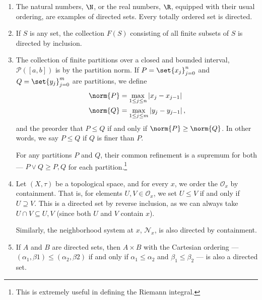 \begin{example}
  \begin{enumerate}[(1)]
    \item The natural numbers, $\N$, or the real numbers, $\R$, equipped with their usual ordering, are examples of directed sets. Every totally ordered set is directed.
    \item If $S$ is any set, the collection $F(S)$ consisting of all finite subsets of $S$ is directed by inclusion.
    \item The collection of finite partitions over a closed and bounded interval, $\mathcal{P}\left(\left[a,b\right]\right)$ is by the partition norm. If $P = \set{x_j}_{j=0}^{n}$ and $Q=\set{y_j}_{j=0}^{m}$ are partitions, we define
      \begin{align*}
        \norm{P} &= \max_{1\leq j\leq n}\left\vert x_j-x_{j-1} \right\vert\\
        \norm{Q} &= \max_{1\leq j \leq m}\left\vert y_{j} - y_{j-1} \right\vert,
      \end{align*}
      and the preorder that $P \leq Q$ if and only if $\norm{P} \geq \norm{Q}$. In other words, we say $P\leq Q$ if $Q$ is finer than $P$.\newline

      For any partitions $P$ and $Q$, their common refinement is a supremum for both --- $P\vee Q \geq P,Q$ for each partition.\footnote{This is extremely useful in defining the Riemann integral.}
    \item Let $\left(X,\tau\right)$ be a topological space, and for every $x$, we order the $\mathcal{O}_{x}$ by containment. That is, for elements $U,V\in \mathcal{O}_{x}$, we set $U\leq V$ if and only if $U\supseteq V$. This is a directed set by reverse inclusion, as we can always take $U\cap V \subseteq U,V$ (since both $U$ and $V$ contain $x$).\newline

      Similarly, the neighborhood system at $x$, $\mathcal{N}_x$, is also directed by containment.
    \item If $A$ and $B$ are directed sets, then $A\times B$ with the Cartesian ordering --- $\left(\alpha_1,\beta 1\right) \leq \left(\alpha_2,\beta 2\right)$ if and only if $\alpha_1\leq \alpha_2$ and $\beta_1 \leq \beta_2$ --- is also a directed set.
  \end{enumerate}
\end{example}
